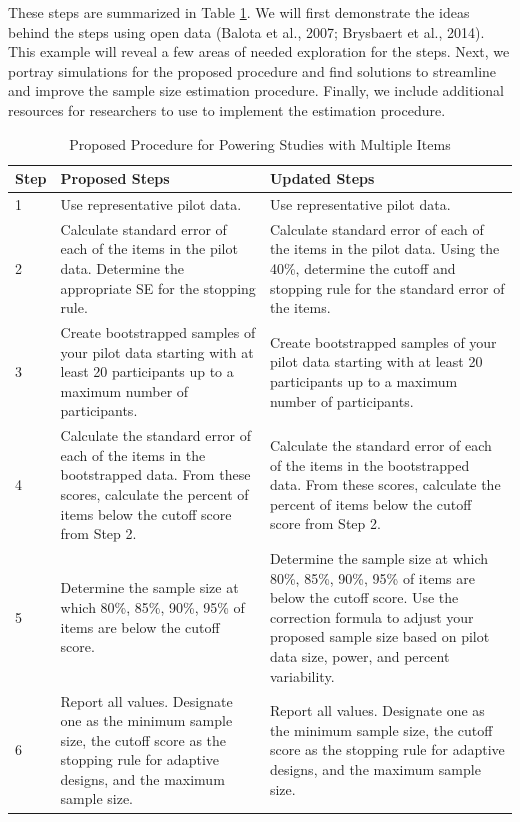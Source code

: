 \documentclass[
  man]{apa7}
\begin{document}
These steps are summarized in Table \ref{tab:table-summary}. We will first demonstrate the ideas behind the steps using open data (Balota et al., 2007; Brysbaert et al., 2014). This example will reveal a few areas of needed exploration for the steps. Next, we portray simulations for the proposed procedure and find solutions to streamline and improve the sample size estimation procedure. Finally, we include additional resources for researchers to use to implement the estimation procedure.

\begin{table}[tbp]

\begin{center}
\begin{threeparttable}

\caption{\label{tab:table-summary}Proposed Procedure for Powering Studies with Multiple Items}

\footnotesize{

\begin{tabular}{m{1cm}m{6cm}m{6cm}}
\toprule
Step & Proposed Steps & Updated Steps\\
\midrule
1 & Use representative pilot data. & Use representative pilot data.\\
2 & Calculate standard error of each of the items in the pilot data. Determine the appropriate SE for the stopping rule. & Calculate standard error of each of the items in the pilot data. Using the 40\%, determine the cutoff and stopping rule for the standard error of the items.\\
3 & Create bootstrapped samples of your pilot data starting with at least 20 participants up to a maximum number of participants. & Create bootstrapped samples of your pilot data starting with at least 20 participants up to a maximum number of participants.\\
4 & Calculate the standard error of each of the items in the bootstrapped data. From these scores, calculate the percent of items below the cutoff score from Step 2. & Calculate the standard error of each of the items in the bootstrapped data. From these scores, calculate the percent of items below the cutoff score from Step 2.\\
5 & Determine the sample size at which 80\%, 85\%, 90\%, 95\% of items are below the cutoff score. & Determine the sample size at which 80\%, 85\%, 90\%, 95\% of items are below the cutoff score. Use the correction formula to adjust your proposed sample size based on pilot data size, power, and percent variability.\\
6 & Report all values. Designate one as the minimum sample size, the cutoff score as the stopping rule for adaptive designs, and the maximum sample size. & Report all values. Designate one as the minimum sample size, the cutoff score as the stopping rule for adaptive designs, and the maximum sample size.\\
\bottomrule
\end{tabular}

}

\end{threeparttable}
\end{center}

\end{table}
\end{document}
